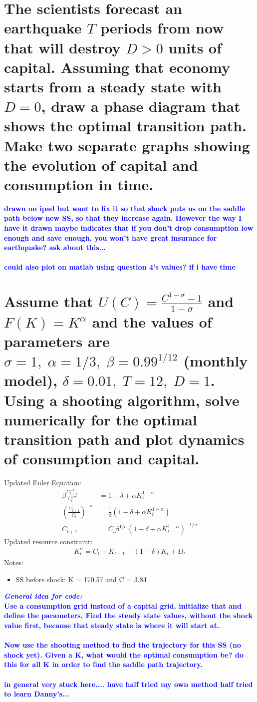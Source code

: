 \documentclass[]{article}
\newcommand{\fix} [1] {\textbf{\textcolor{blue}{#1}}} %
\begin{document}
\section{The  scientists  forecast  an  earthquake $T$ periods  from  now  that  will  destroy $D >0$ units of capital.  Assuming that economy starts from a steady state with $D= 0$, draw a phase diagram that shows the optimal transition path.  Make two separate graphs showing the evolution of capital and consumption in time.}
\fix{drawn on ipad but want to fix it so that shock puts us on the saddle path below new SS, so that they increase again. However the way I have it drawn maybe indicates that if you don't drop consumption low enough and save enough, you won't have great insurance for earthquake? ask about this...} \\
\\
\fix{could also plot on matlab using question 4's values? if i have time} 

\section{Assume that $U(C) = \frac{C^{1-\sigma}-1}{1-\sigma} $ and $F(K)= K^\alpha$ and the values of parameters are $\sigma= 1,\;\alpha= 1/3,\;\beta= 0.99^{1/12}$ (monthly model), $\delta = 0.01,\; T= 12,\;D= 1$.  Using a shooting algorithm,  solve  numerically  for  the  optimal  transition  path  and  plot  dynamics  of consumption and capital.}
Updated Euler Equation:
\begin{align*}
\beta\frac{C_{t+1}^{-\sigma}}{C_t^{-\sigma}}  & = 1-\delta + \alpha K_t^{1-\alpha} \\
\left(\frac{C_{t+1}}{C_t}\right)^{-\sigma}
& = \frac{1}{\beta} \left( 1-\delta + \alpha K_t^{1-\alpha} \right) \\
C_{t+1} & = C_t\beta^{1/\sigma} (1-\delta+\alpha K_t^{1-\alpha})^{-1/\sigma}
\end{align*}
Updated resource constraint:
\begin{align*}
K_t^\alpha = C_t + K_{t+1} -(1-\delta)K_t +D_t
\end{align*}
Notes:
\begin{itemize}
\item SS before shock: K = 170.57 and C = 3.84
\end{itemize}

\fix{\emph{General idea for code:}\\Use a consumption grid instead of a capital grid. initialize that and define the parameters. Find the steady state values, without the shock value first, because that steady state is where it will start at.\\\\Now use the shooting method to find the trajectory for this SS (no shock yet). Given a K, what would the optimal consumption be? do this for all K in order to find the saddle path trajectory. \\\\ in general very stuck here.... have half tried my own method half tried to learn Danny's...
}
\end{document}
